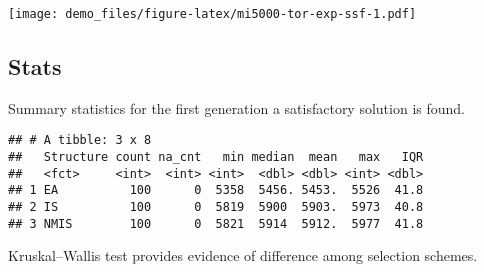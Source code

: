 \documentclass[]{book}
\newenvironment{Shaded}{\begin{snugshade}}{\end{snugshade}}
\newcommand{\CharTok}[1]{\textcolor[rgb]{0.31,0.60,0.02}{#1}}
\newcommand{\DataTypeTok}[1]{\textcolor[rgb]{0.13,0.29,0.53}{#1}}
\newcommand{\DecValTok}[1]{\textcolor[rgb]{0.00,0.00,0.81}{#1}}
\newcommand{\KeywordTok}[1]{\textcolor[rgb]{0.13,0.29,0.53}{\textbf{#1}}}
\newcommand{\NormalTok}[1]{#1}
\newcommand{\OperatorTok}[1]{\textcolor[rgb]{0.81,0.36,0.00}{\textbf{#1}}}
\newcommand{\OtherTok}[1]{\textcolor[rgb]{0.56,0.35,0.01}{#1}}
\newcommand{\StringTok}[1]{\textcolor[rgb]{0.31,0.60,0.02}{#1}}
\begin{document}
\texttt{[image: demo\_files/figure-latex/mi5000-tor-exp-ssf-1.pdf]}

\hypertarget{stats-57}{%
\subsection{Stats}\label{stats-57}}

Summary statistics for the first generation a satisfactory solution is found.

\begin{Shaded}
\end{Shaded}

\begin{verbatim}
## # A tibble: 3 x 8
##   Structure count na_cnt   min median  mean   max   IQR
##   <fct>     <int>  <int> <int>  <dbl> <dbl> <int> <dbl>
## 1 EA          100      0  5358  5456. 5453.  5526  41.8
## 2 IS          100      0  5819  5900  5903.  5973  40.8
## 3 NMIS        100      0  5821  5914  5912.  5977  41.8
\end{verbatim}

Kruskal--Wallis test provides evidence of difference among selection schemes.
\end{document}
